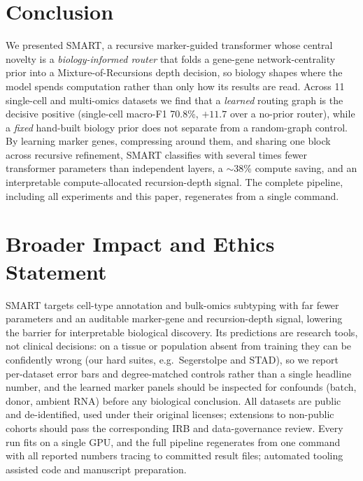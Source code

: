 \documentclass[letterpaper]{article}
\begin{document}
\section{Conclusion}
We presented SMART, a recursive marker-guided transformer whose central novelty is a
\emph{biology-informed router} that folds a gene-gene network-centrality prior into a
Mixture-of-Recursions depth decision, so biology shapes where the model spends
computation rather than only how its results are read. Across 11 single-cell
and multi-omics datasets we find that a \emph{learned} routing graph is the decisive
positive (single-cell macro-F1 70.8\%, $+11.7$ over a
no-prior router), while a \emph{fixed} hand-built biology prior does not separate from a
random-graph control. By learning marker genes, compressing around them, and sharing one
block across recursive refinement, SMART classifies with several times fewer transformer
parameters than independent layers, a $\sim$38\% compute saving, and an
interpretable compute-allocated recursion-depth signal. The complete pipeline, including
all experiments and this paper, regenerates from a single command.

\section{Broader Impact and Ethics Statement}
SMART targets cell-type annotation and bulk-omics subtyping with far fewer parameters and
an auditable marker-gene and recursion-depth signal, lowering the barrier for interpretable
biological discovery. Its predictions are research tools, not clinical decisions: on a
tissue or population absent from training they can be confidently wrong (our hard suites,
e.g.\ Segerstolpe and STAD), so we report per-dataset error bars and degree-matched
controls rather than a single headline number, and the learned marker panels should be
inspected for confounds (batch, donor, ambient RNA) before any biological conclusion. All
datasets are public and de-identified, used under their original licenses; extensions to
non-public cohorts should pass the corresponding IRB and data-governance review. Every run
fits on a single GPU, and the full pipeline regenerates from one command with all reported
numbers tracing to committed result files; automated tooling assisted code and manuscript
preparation.



\end{document}
